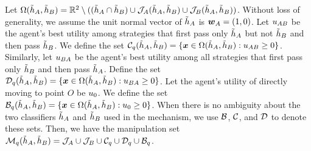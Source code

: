 Let $\Omega(\tilde{h}_A,\tilde{h}_B) = \mathbb{R}^2 \setminus ((\tilde{h}_A\cap\tilde{h}_B)\cup \mathcal{J}_A(\tilde {h}_A, \tilde {h}_B)\cup \mathcal{J}_B(\tilde {h}_A, \tilde {h}_B))$.
Without loss of generality, we assume the unit normal vector of $\tilde{h}_A$ is $\boldsymbol{w}_A = (1,0)$.
Let $u_{AB}$ be the agent's best utility among strategies that first pass only $\tilde {h}_A$ but not $\tilde {h}_B$ and then pass $\tilde {h}_B$. 
We define the set $\mathcal{C}_{q}(\tilde{h}_A,\tilde{h}_B)=\{\boldsymbol{x}\in\Omega(\tilde{h}_A,\tilde{h}_B): u_{AB}\geq 0\}$.
Similarly, let $u_{BA}$ be the agent's best utility among all strategies that first pass only $\tilde{h}_B$ and then pass $\tilde{h}_A$. 
Define the set $\mathcal{D}_{q}(\tilde{h}_A,\tilde{h}_B)=\{\boldsymbol{x}\in\Omega(\tilde{h}_A,\tilde{h}_B): u_{BA}\geq 0\}$.
Let the agent's utility of directly moving to point $O$ be $u_{0}$.
We define the set $\mathcal{B}_{q}(\tilde{h}_A,\tilde{h}_B)=\{\boldsymbol{x}\in\Omega(\tilde{h}_A,\tilde{h}_B): u_{0}\geq 0 \}$.
When there is no ambiguity about the two classifiers $\tilde {h}_A$ and $\tilde {h}_B$ used in the mechanism, we use $\mathcal{B}$, $\mathcal{C}$, and $\mathcal{D}$ to denote these sets. 
Then, we have the manipulation set $\mathcal{M}_{q}(\tilde {h}_A,\tilde{h}_B)=\mathcal{J}_A \cup \mathcal{J}_B \cup \mathcal{C}_{q}\cup \mathcal{D}_{q}\cup \mathcal{B}_{q}$.


